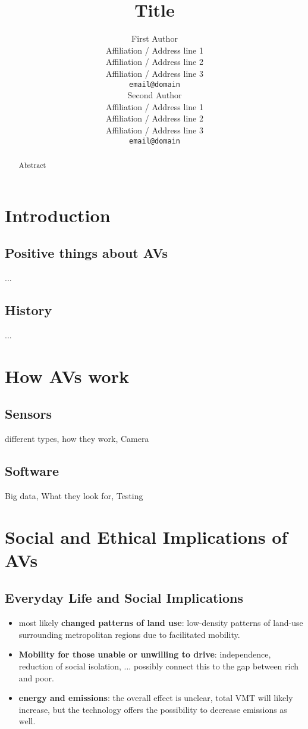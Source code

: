 \documentclass[11pt]{article}
\title{Title}
\author{First Author \\
  Affiliation / Address line 1 \\
  Affiliation / Address line 2 \\
  Affiliation / Address line 3 \\
  {\tt email@domain} \\\And
  Second Author \\
  Affiliation / Address line 1 \\
  Affiliation / Address line 2 \\
  Affiliation / Address line 3 \\
  {\tt email@domain} \\}
\date{}
\begin{document}
\maketitle
\begin{abstract}
Abstract
\end{abstract}

\section{Introduction}
\subsection{Positive things about AVs}
...
\subsection{History}
...

\section{How AVs work}
\subsection{Sensors}
different types, how they work, Camera 

\subsection{Software}
Big data, What they look for, Testing

\section{Social and Ethical Implications of AVs}

\subsection{Everyday Life and Social Implications}
\cite{Rand:16}
\begin{itemize}
\item most likely \textbf{changed patterns of land use}: low-density patterns of land-use surrounding metropolitan regions due to facilitated mobility.  
\item \textbf{Mobility for those unable or unwilling to drive}: independence, reduction of social isolation, ... possibly connect this to the gap between rich and poor.
\item \textbf{energy and emissions}: the overall effect is unclear, total VMT will likely increase, but the technology offers the possibility to decrease emissions as well. 
\end{itemize}
\end{document}
